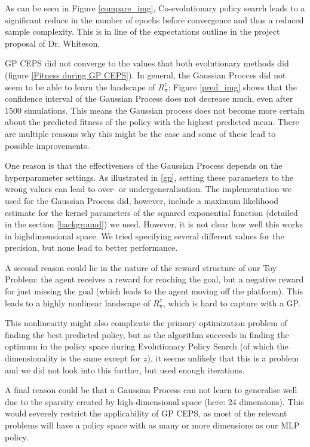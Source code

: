 
As can be seen in Figure \ref{compare_img}, Co-evolutionary policy search leads to a significant reduce in the number of epochs before convergence and thus a reduced sample complexity. This is in line of the expectations outline in the project proposal of Dr. Whiteson.

GP CEPS did not converge to the values that both evolutionary methods did (figure \ref{Fitness during GP CEPS}). In general, the Gaussian Procces did not seem to be able to learn the landscape of $R_{\pi}^z$: Figure \ref{pred_img} shows that the confidence interval of the Gaussian Process does not decrease much, even after 1500 simulations. This means the Gaussian process does not become more certain about the predicted fitness of the policy with the highest predicted mean.
There are multiple reasons why this might be the case and some of these lead to possible improvements. 

One reason is that the effectiveness of the Gaussian Process depends on the hyperparameter settings. As illustrated in \ref{gp}, setting these parameters to the wrong values can lead to over- or undergeneralisation. The implementation we used for the Gaussian Process did, however, include a maximum likelihood estimate for the kernel parameters of the squared exponential function (detailed in the section \ref{background}) we used. However, it is not clear how well this works in highdimensional space. We tried specifying several different values for the precision, but none lead to better performance. 

A second reason could lie in the nature of the reward   structure of our Toy Problem: the agent receives a reward for reaching the goal, but a negative reward for just missing the goal (which leads to the agent moving off the platform). This leads to a highly nonlinear landscape of $R_{\pi}^z$, which is hard to capture with a GP. 

This nonlinearity might also complicate the primary optimization problem of finding the best predicted policy, but as the algorithm succeeds in finding the optimum in the policy space during Evolutionary Policy Search (of which the dimensionality is the same except for $z$), it seems unlikely that this is a problem and we did not look into this further, but used enough iterations.

A final reason could be that a Gaussian Process can not learn to generalise well due to the sparsity created by high-dimensional space (here: 24 dimensions). This would severely restrict the applicability of GP CEPS, as most of the relevant problems will have a policy space with as many or more dimensions as our MLP policy.

